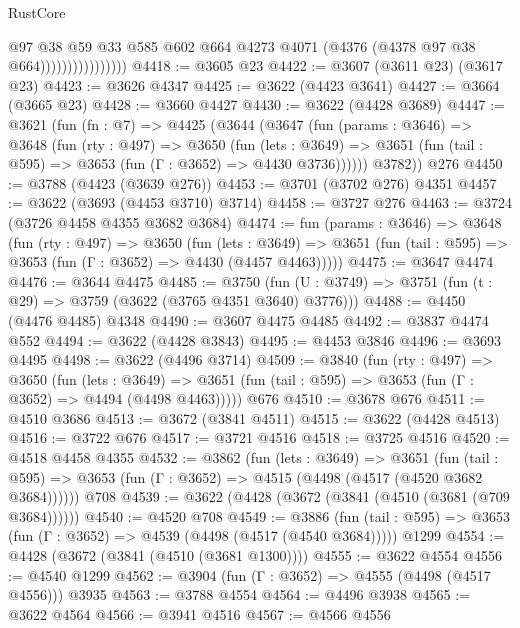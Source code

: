 \begin{lexlean}{RustCore}
\begin{coremodule}
                                @97
                                @38
                                @59
                                @33
                                @585
                                @602
                                @664
                                @4273
                                @4071
                                (@4376 (@4378 @97 @38 @664))))))))))))))))
@4418 := @3605 @23
@4422 := @3607 (@3611 @23) (@3617 @23)
@4423 := @3626 @4347
@4425 := @3622 (@4423 @3641)
@4427 := @3664 (@3665 @23)
@4428 := @3660 @4427
@4430 := @3622 (@4428 @3689)
@4447 := @3621
    (fun (fn : @7) =>
    @4425
      (@3644
        (@3647
          (fun (params : @3646) =>
          @3648
            (fun (rty : @497) =>
            @3650
              (fun (lets : @3649) =>
              @3651 (fun (tail : @595) => @3653 (fun (Γ : @3652) => @4430 @3736))))))
        @3782))
    @276
@4450 := @3788 (@4423 (@3639 @276))
@4453 := @3701 (@3702 @276) @4351
@4457 := @3622 (@3693 (@4453 @3710) @3714)
@4458 := @3727 @276
@4463 := @3724 (@3726 @4458 @4355 @3682 @3684)
@4474 := fun (params : @3646) =>
  @3648
    (fun (rty : @497) =>
    @3650
      (fun (lets : @3649) =>
      @3651 (fun (tail : @595) => @3653 (fun (Γ : @3652) => @4430 (@4457 @4463)))))
@4475 := @3647 @4474
@4476 := @3644 @4475
@4485 := @3750 (fun (U : @3749) => @3751 (fun (t : @29) => @3759 (@3622 (@3765 @4351 @3640) @3776)))
@4488 := @4450 (@4476 @4485) @4348
@4490 := @3607 @4475 @4485
@4492 := @3837 @4474 @552
@4494 := @3622 (@4428 @3843)
@4495 := @4453 @3846
@4496 := @3693 @4495
@4498 := @3622 (@4496 @3714)
@4509 := @3840
    (fun (rty : @497) =>
    @3650
      (fun (lets : @3649) =>
      @3651 (fun (tail : @595) => @3653 (fun (Γ : @3652) => @4494 (@4498 @4463)))))
    @676
@4510 := @3678 @676
@4511 := @4510 @3686
@4513 := @3672 (@3841 @4511)
@4515 := @3622 (@4428 @4513)
@4516 := @3722 @676
@4517 := @3721 @4516
@4518 := @3725 @4516
@4520 := @4518 @4458 @4355
@4532 := @3862
    (fun (lets : @3649) =>
    @3651
      (fun (tail : @595) => @3653 (fun (Γ : @3652) => @4515 (@4498 (@4517 (@4520 @3682 @3684))))))
    @708
@4539 := @3622 (@4428 (@3672 (@3841 (@4510 (@3681 (@709 @3684))))))
@4540 := @4520 @708
@4549 := @3886
    (fun (tail : @595) => @3653 (fun (Γ : @3652) => @4539 (@4498 (@4517 (@4540 @3684)))))
    @1299
@4554 := @4428 (@3672 (@3841 (@4510 (@3681 @1300))))
@4555 := @3622 @4554
@4556 := @4540 @1299
@4562 := @3904 (fun (Γ : @3652) => @4555 (@4498 (@4517 @4556))) @3935
@4563 := @3788 @4554
@4564 := @4496 @3938
@4565 := @3622 @4564
@4566 := @3941 @4516
@4567 := @4566 @4556

\end{coremodule}
\end{lexlean}
